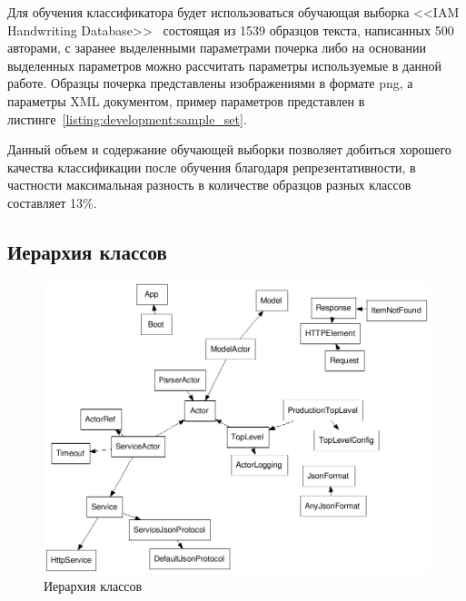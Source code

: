 

Для обучения классификатора будет использоваться обучающая выборка <<IAM Handwriting Database>>~\cite{IAM_handwriting_database} состоящая из 1539 образцов текста, написанных 500 авторами, с заранее выделенными параметрами почерка либо на основании выделенных параметров можно рассчитать параметры используемые в данной работе. Образцы почерка представлены изображениями в формате png, а параметры XML документом, пример параметров представлен в листинге~\ref{listing:development:sample_set}.


Данный объем и содержание обучающей выборки позволяет добиться хорошего качества классификации после обучения благодаря репрезентативности, в частности максимальная разность в количестве образцов разных классов составляет 13\%.

\subsection{Иерархия классов}
\begin{figure}[!ht]
    \centering
    \includegraphics[width=1\textwidth]{figures/classes-fdp.png}
    \caption{Иерархия классов}
    \label{fig:develoipment:class_fdp}
\end{figure}

